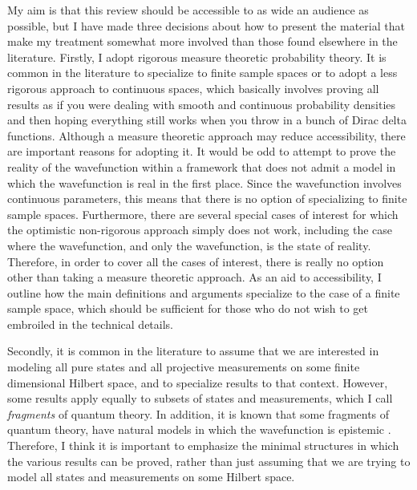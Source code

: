 \documentclass[DIV=calc,fontsize=12pt]{scrartcl} %
\theoremstyle{definition}
\theoremstyle{plain}
\begin{document}
My aim is that this review should be accessible to as wide an audience
as possible, but I have made three decisions about how to present the
material that make my treatment somewhat more involved than those
found elsewhere in the literature.  Firstly, I adopt rigorous measure
theoretic probability theory.  It is common in the literature to
specialize to finite sample spaces or to adopt a less rigorous
approach to continuous spaces, which basically involves proving all
results as if you were dealing with smooth and continuous probability
densities and then hoping everything still works when you throw in a
bunch of Dirac delta functions.  Although a measure theoretic approach
may reduce accessibility, there are important reasons for adopting it.
It would be odd to attempt to prove the reality of the wavefunction
within a framework that does not admit a model in which the
wavefunction is real in the first place.  Since the wavefunction
involves continuous parameters, this means that there is no option of
specializing to finite sample spaces.  Furthermore, there are several
special cases of interest for which the optimistic non-rigorous
approach simply does not work, including the case where the
wavefunction, and only the wavefunction, is the state of reality.
Therefore, in order to cover all the cases of interest, there is
really no option other than taking a measure theoretic approach.  As
an aid to accessibility, I outline how the main definitions and
arguments specialize to the case of a finite sample space, which
should be sufficient for those who do not wish to get embroiled in the
technical details.

Secondly, it is common in the literature to assume that we are
interested in modeling all pure states and all projective
measurements on some finite dimensional Hilbert space, and to
specialize results to that context.  However, some results apply
equally to subsets of states and measurements, which I call
\emph{fragments} of quantum theory.  In addition, it is known that
some fragments of quantum theory, have natural models in which the
wavefunction is epistemic \cite{Spekkens2007, Schreiber,
Bartlett2012}.  Therefore, I think it is important to emphasize the
minimal structures in which the various results can be proved, rather
than just assuming that we are trying to model all states and
measurements on some Hilbert space.
\end{document}
